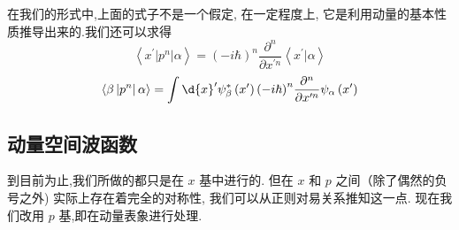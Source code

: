 \documentclass[lang=cn,newtx,10pt,scheme=chinese,thmcnt=section]{elegantbook}
\begin{document}
在我们的形式中,上面的式子不是一个假定, 在一定程度上, 它是利用动量的基本性质推导出来的.我们还可以求得
\begin{equation}
	\left\langle {{x}^{\prime }\left| {p}^{n}\right| \alpha }\right\rangle = {\left( -i\hbar \right) }^{n}\frac{{\partial }^{n}}{\partial {x}^{\prime n}}\left\langle {{x}^{\prime } | \alpha }\right\rangle
\end{equation}
\begin{equation}
	\left\langle {\beta \left| {p}^{n}\right| \alpha }\right\rangle = \int \d{x}^{\prime }{\psi }_{\beta }^{ * }\left( {x}^{\prime }\right) {\left( -i\hbar \right) }^{n}\frac{{\partial }^{n}}{\partial {x}^{\prime n}}{\psi }_{\alpha }\left( {x}^{\prime }\right)
\end{equation}
\subsection*{动量空间波函数}
到目前为止,我们所做的都只是在 $x$ 基中进行的. 但在 $x$ 和 $p$ 之间（除了偶然的负号之外) 实际上存在着完全的对称性, 我们可以从正则对易关系推知这一点. 现在我们改用 $p$ 基,即在动量表象进行处理.
\end{document}
